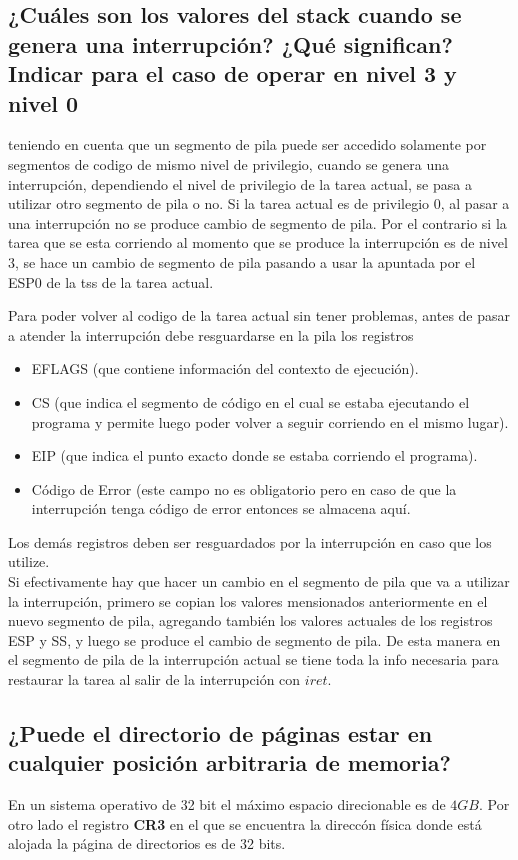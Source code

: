 \documentclass[a4paper,10pt,twoside]{article}
\begin{document}
\subsection{¿Cuáles son los valores del stack cuando se genera una interrupción? ¿Qué significan? Indicar para el caso de operar en nivel 3 y nivel 0}
teniendo en cuenta que un segmento de pila puede ser accedido solamente por segmentos de codigo de mismo nivel de privilegio, cuando se genera una interrupción, dependiendo el nivel de privilegio de la tarea actual, se pasa a utilizar otro segmento de pila o no. Si la tarea actual es de privilegio 0, al pasar a una interrupción no se produce cambio de segmento de pila. Por el contrario si la tarea que se esta corriendo al momento que se produce la interrupción es de nivel 3, se hace un cambio de segmento de pila pasando a usar la apuntada por el ESP0 de la tss de la tarea actual.

Para poder volver al codigo de la tarea actual sin tener problemas, antes de pasar a atender la interrupción debe resguardarse en la pila los registros
\begin{itemize}
 \item EFLAGS (que contiene información del contexto de ejecución).
 \item CS (que indica el segmento de código en el cual se estaba ejecutando el programa y permite luego poder volver a seguir corriendo en el mismo lugar).
 \item EIP (que indica el punto exacto donde se estaba corriendo el programa).
 \item Código de Error (este campo no es obligatorio pero en caso de que la interrupción tenga código de error entonces se almacena aquí.
\end{itemize}

Los demás registros deben ser resguardados por la interrupción en caso que los utilize.\\

Si efectivamente hay que hacer un cambio en el segmento de pila que va a utilizar la interrupción, primero se copian los valores mensionados anteriormente en el nuevo segmento de pila, agregando también los valores actuales de  los registros ESP y SS, y luego se produce el cambio de segmento de pila. De esta manera en el segmento de pila de la interrupción actual se tiene toda la info necesaria para restaurar la tarea al salir de la interrupción con $iret$.


\subsection{¿Puede el directorio de páginas estar en cualquier posición arbitraria de memoria?}
En un sistema operativo de 32 bit el máximo espacio direcionable es de $4GB$. Por otro lado el registro \textbf{CR3} en el que se encuentra la direccón física donde está alojada la página de directorios es de 32 bits. \\
\end{document}

